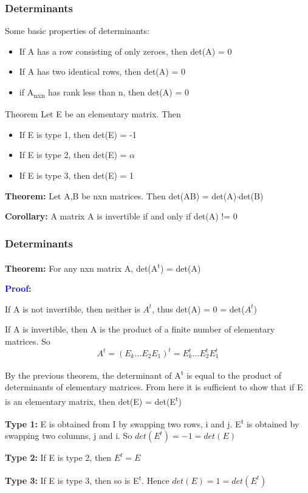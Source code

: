 \documentclass[11pt]{beamer}
\begin{document}
\begin{frame}
	\frametitle{Determinants}
	Some basic properties of determinants:
	\begin{itemize}
		\item If A has a row consisting of only zeroes, then det(A) = 0
		\item If A has two identical rows, then det(A) = 0
		\item if A\textsubscript{nxn} has rank less than n, then det(A) = 0
	\end{itemize}
	
	\begin{block}{Theorem}
		Let E be an elementary matrix. Then
		\begin{itemize}
			\item If E is type 1, then det(E) = -1
			\item If E is type 2, then det(E) = $\alpha$
			\item If E is type 3, then det(E) = 1
		\end{itemize}
	\end{block}

	\phantom{text}

	\textbf{Theorem:} Let A,B be nxn matrices. Then det(AB) = det(A)$\cdot$det(B)

	\phantom{text}

	\textbf{Corollary:} A matrix A is invertible if and only if det(A) != 0
\end{frame}

\begin{frame}
	\frametitle{Determinants}	
	\textbf{Theorem:} For any nxn matrix A, det(A\textsuperscript{t}) = det(A)

	\phantom{text}
	
	\textbf{\textcolor{blue}{Proof}:}
	
	If A is not invertible, then neither is $A^{t}$, thus det(A) = 0 = det($A^{t}$)
	
	If A is invertible, then A is the product of a finite number of elementary matrices. So
	\[
		A^{t} = (E_{k}...E_{2}E_{1})^{t} 
		= E_{k}^{t}...E_{2}^{t}E_{1}^{t}
	\]

	By the previous theorem, the determinant of A\textsuperscript{t} is equal to the product of determinants of elementary matrices. From here it is sufficient to show that if E is an elementary matrix, then det(E) = det(E\textsuperscript{t})
	
	\phantom{text}
	
	\textbf{Type 1:} E is obtained from I by swapping two rows, i and j. E\textsuperscript{t} is obtained by swapping two columns, j and i. So $det(E^{t}) = -1 = det(E)$
	
	\textbf{Type 2:} If E is type 2, then $E^{t} = E$
	
	\textbf{Type 3:} If E is type 3, then so is E\textsuperscript{t}. Hence $ det(E) = 1 = det(E^{t}) $
\end{frame}
\end{document}
